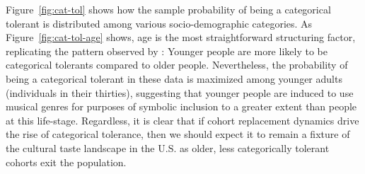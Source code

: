 \documentclass[12pt]{article}
\begin{document}
Figure~\ref{fig:cat-tol} shows how the sample probability of being a categorical tolerant is distributed among various socio-demographic categories. As Figure~\ref{fig:cat-tol-age} shows, age is the most straightforward structuring factor, replicating the pattern observed by \citet{lizardo2016end-4fb}: Younger people are more likely to be categorical tolerants compared to older people. Nevertheless, the probability of being a categorical tolerant in these data is maximized among younger adults (individuals in their thirties), suggesting that younger people are induced to use musical genres for purposes of symbolic inclusion to a greater extent than people at this life-stage. Regardless, it is clear that if cohort replacement dynamics drive the rise of categorical tolerance, then we should expect it to remain a fixture of the cultural taste landscape in the U.S. as older, less categorically tolerant cohorts exit the population. 
\end{document}
